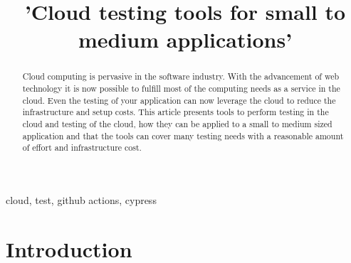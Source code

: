 \documentclass[conference]{IEEEtran}
\begin{document}
\title{'Cloud testing tools for small to medium applications'}

\author{
}

\maketitle

\begin{abstract}
	Cloud computing is pervasive in the software industry.
	With the advancement of web technology it is now possible to fulfill most of the computing needs as a service
	in the cloud.
	Even the testing of your application can now leverage the cloud to reduce the infrastructure and setup costs.
	This article presents tools to perform testing in the cloud and testing of the cloud, how they can
	be applied to a small to medium sized application and that the tools can cover many testing needs with a reasonable
	amount of effort and infrastructure cost.
\end{abstract}

\begin{IEEEkeywords}
	cloud, test, github actions, cypress
\end{IEEEkeywords}

\section{Introduction}
\end{document}
